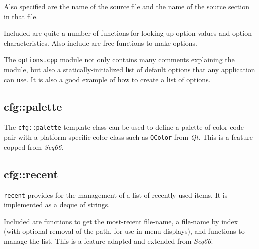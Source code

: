    Also specified are the name of the source file and the name of the
   source section in that file.

   Included are quite a number of functions for looking up option values
   and option characteristics.
   Also include are free functions to make options.

   The \texttt{options.cpp} module not only contains many comments explaining
   the module, but also a statically-initialized list of
   default options that any application can use.
   It is also a good example of how to create a list of options.

\subsection{cfg::palette}
\label{subsec:cfg_namespace_}

   The \texttt{cfg::palette} template class can be used to define
   a palette of color code pair with a platform-specific color class
   such as \texttt{QColor} from \textsl{Qt}.
   This is a feature copped from \textsl{Seq66}.

\subsection{cfg::recent}
\label{subsec:cfg_namespace_recent}

   \texttt{recent} provides for the management of a list of recently-used
   items. It is implemented as a deque of strings.

   Included are functions to get the most-recent file-name, a file-name by
   index (with optional removal of the path, for use in menu displays),
   and functions to manage the list.
   This is a feature adapted and extended from \textsl{Seq66}.

